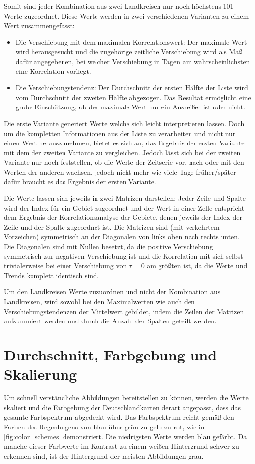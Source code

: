 Somit sind jeder Kombination aus zwei Landkreisen nur noch höchstens 101 Werte zugeordnet. Diese Werte werden in zwei verschiedenen Varianten zu einem Wert zusammengefasst:
\begin{itemize}
    \item Die Verschiebung mit dem maximalen Korrelationswert: Der maximale Wert wird herausgesucht und die zugehörige zeitliche Verschiebung wird als Maß dafür angegebenen, bei welcher Verschiebung in Tagen am wahrscheinlichsten eine Korrelation vorliegt.
    \item Die Verschiebungstendenz: Der Durchschnitt der ersten Hälfte der Liste wird vom Durchschnitt der zweiten Hälfte abgezogen. Das Resultat ermöglicht eine grobe Einschätzung, ob der maximale Wert nur ein Ausreißer ist oder nicht.
\end{itemize}
Die erste Variante generiert Werte welche sich leicht interpretieren lassen. Doch um die kompletten Informationen aus der Liste zu verarbeiten und nicht nur einen Wert herauszunehmen, bietet es sich an, das Ergebnis der ersten Variante mit dem der zweiten Variante zu vergleichen.
Jedoch lässt sich bei der zweiten Variante nur noch feststellen, ob die Werte der Zeitserie vor, nach oder mit den Werten der anderen wachsen, jedoch nicht mehr wie viele Tage früher/später - dafür braucht es das Ergebnis der ersten Variante.

Die Werte lassen sich jeweils in zwei Matrizen darstellen: Jeder Zeile und Spalte wird der Index für ein Gebiet zugeordnet und der Wert in einer Zelle entspricht dem Ergebnis der Korrelationsanalyse der Gebiete, denen jeweils der Index der Zeile und der Spalte zugeordnet ist.
Die Matrizen sind (mit verkehrtem Vorzeichen) symmetrisch an der Diagonalen von links oben nach rechts unten. Die Diagonalen sind mit Nullen besetzt, da die positive Verschiebung symmetrisch zur negativen Verschiebung ist und die Korrelation mit sich selbst trivialerweise bei einer Verschiebung von $\tau=0$ am größten ist, da die Werte und Trends komplett identisch sind.

Um den Landkreisen Werte zuzuordnen und nicht der Kombination aus Landkreisen, wird sowohl bei den Maximalwerten wie auch den Verschiebungstendenzen der Mittelwert gebildet, indem die Zeilen der Matrizen aufsummiert werden und durch die Anzahl der Spalten geteilt werden.
\section{Durchschnitt, Farbgebung und Skalierung}\label{sec:Durchschnitt, Farbgebung und Skalierung}
Um schnell verständliche Abbildungen bereitstellen zu können, werden die Werte skaliert und die Farbgebung der Deutschlandkarten derart angepasst, dass das gesamte Farbspektrum abgedeckt wird. Das Farbspektrum reicht gemäß den Farben des Regenbogens von blau über grün zu gelb zu rot, wie in \autoref{fig:color_schemes} demonstriert. Die niedrigsten Werte werden blau gefärbt.
Da manche dieser Farbwerte im Kontrast zu einem weißen Hintergrund schwer zu erkennen sind, ist der Hintergrund der meisten Abbildungen grau.

